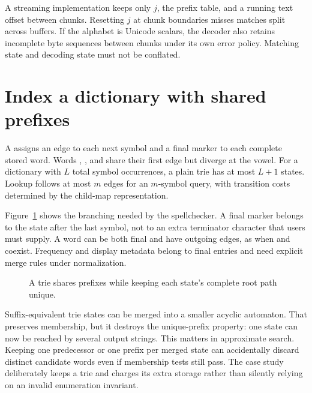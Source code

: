 A streaming implementation keeps only $j$, the prefix table, and a running text offset between chunks.
Resetting $j$ at chunk boundaries misses matches split across buffers.
If the alphabet is Unicode scalars, the decoder also retains incomplete byte sequences between chunks under its own error policy.
Matching state and decoding state must not be conflated.

\section{Index a dictionary with shared prefixes}
\label{sec:ch78-trie}
A  assigns an edge to each next symbol and a final marker to each complete stored word.
Words , , and  share their first edge but diverge at the vowel.
For a dictionary with $L$ total symbol occurrences, a plain trie has at most $L+1$ states.
Lookup follows at most $m$ edges for an $m$-symbol query, with transition costs determined by the child-map representation.

Figure~\ref{fig:ch78-trie} shows the branching needed by the spellchecker.
A final marker belongs to the state after the last symbol, not to an extra terminator character that users must supply.
A word can be both final and have outgoing edges, as when  and  coexist.
Frequency and display metadata belong to final entries and need explicit merge rules under normalization.

\begin{figure}[htbp]
\centering
{}
\caption{A trie shares prefixes while keeping each state's complete root path unique.}
\label{fig:ch78-trie}
\end{figure}

Suffix-equivalent trie states can be merged into a smaller acyclic automaton.
That preserves membership, but it destroys the unique-prefix property: one state can now be reached by several output strings.
This matters in approximate search.
Keeping one predecessor or one prefix per merged state can accidentally discard distinct candidate words even if membership tests still pass.
The case study deliberately keeps a trie and charges its extra storage rather than silently relying on an invalid enumeration invariant.

